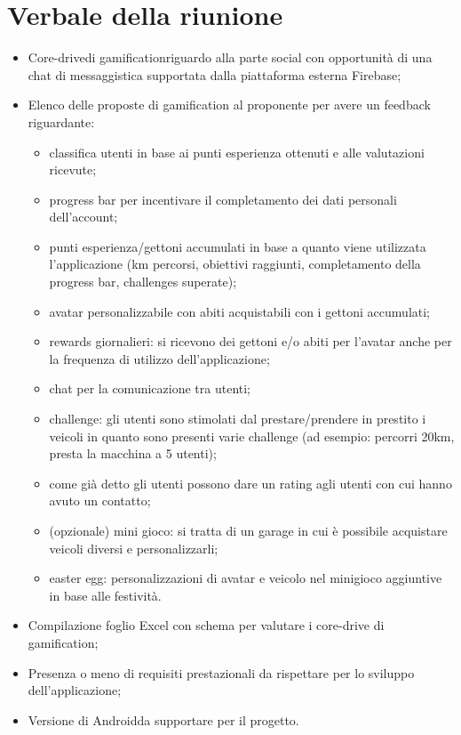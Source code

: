 \section{Verbale della riunione}
\begin{itemize}
	\item Core-drive\glosp di gamification\glosp riguardo alla parte social con opportunità di una chat di messaggistica supportata dalla piattaforma esterna Firebase\glo;
	\item Elenco delle proposte di gamification al proponente per avere un feedback riguardante:
		\begin{itemize}
			\item classifica utenti in base ai punti esperienza ottenuti e alle valutazioni ricevute;
			\item progress bar per incentivare il completamento dei dati personali dell'account;
			\item punti esperienza/gettoni accumulati in base a quanto viene utilizzata l'applicazione (km percorsi, obiettivi raggiunti, completamento della progress bar, challenges superate);
			\item avatar personalizzabile con abiti acquistabili con i gettoni accumulati;
			\item rewards giornalieri: si ricevono dei gettoni e/o abiti per l'avatar anche per la frequenza di utilizzo dell'applicazione;
			\item chat per la comunicazione tra utenti;
			\item challenge: gli utenti sono stimolati dal prestare/prendere in prestito i veicoli in quanto sono presenti varie challenge (ad esempio: percorri  20km, presta la macchina a 5 utenti);
			\item come già detto gli utenti possono dare un rating agli utenti con cui hanno avuto un contatto;
			\item (opzionale) mini gioco: si tratta di un garage in cui è possibile acquistare veicoli diversi e personalizzarli;
			\item easter egg: personalizzazioni di avatar e veicolo nel minigioco aggiuntive in base alle festività.
		\end{itemize}
	\item Compilazione foglio Excel con schema per valutare i core-drive di gamification;
	\item Presenza o meno di requisiti prestazionali da rispettare per lo sviluppo dell'applicazione;
	\item Versione di Android\glosp da supportare per il progetto.
\end{itemize} 
\pagebreak
